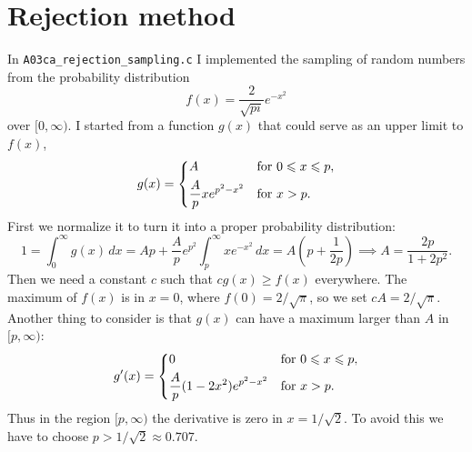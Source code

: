 \section{Rejection method}
In \texttt{A03ca\_rejection\_sampling.c} I implemented the sampling of random
numbers from the probability distribution
\begin{equation}
    f(x) = \frac{2}{\sqrt{pi}} e^{-x^{2}}
\end{equation}
over $[0, \infty)$. I started from a function $g(x)$ that could serve as an
upper limit to $f(x)$,
\begin{equation}
    g(x) =
    \begin{dcases}
        A & \text{for } 0 \leq x \leq p, \\
        \frac{A}{p}x e^{p^{2} - x^{2}} & \text{for } x > p.
    \end{dcases}
\end{equation}
First we normalize it to turn it into a proper probability distribution:
\begin{equation}
    1 = \int_{0}^{\infty} g(x) \, dx = Ap + \frac{A}{p}e^{p^{2}}
    \int_{p}^{\infty} x e^{-x^{2}} \, dx = A \left(p + \frac{1}{2p}\right)
    \implies A = \frac{2p}{1 + 2p^{2}}.
\end{equation}
Then we need a constant $c$ such that $c g(x) \geq f(x)$ everywhere. The maximum
of $f(x)$ is in $x = 0$, where $f(0) = 2 / \sqrt{\pi}$, so we set $c A = 2 /
\sqrt{\pi}$. Another thing to consider is that $g(x)$ can have a maximum larger
than $A$ in $[p, \infty)$:
\begin{equation}
    g'(x) = 
    \begin{dcases}
        0 & \text{for } 0 \leq x \leq p, \\
        \frac{A}{p}(1 - 2x^{2}) e^{p^{2} - x^{2}} & \text{for } x > p.
    \end{dcases}
\end{equation}
Thus in the region $[p, \infty)$ the derivative is zero in $x = 1 / \sqrt{2}$.
To avoid this we have to choose $p > 1 / \sqrt{2} \approx \num{0.707}$.

